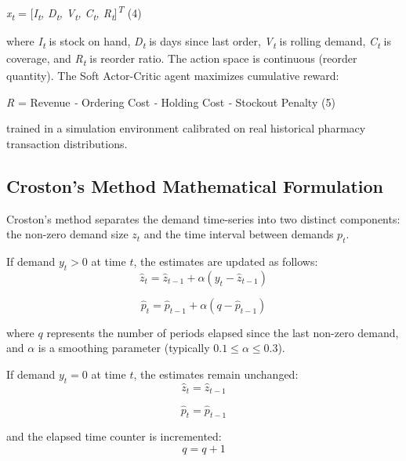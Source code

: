 \documentclass[12pt,a4paper,oneside]{report}
\begin{document}
\emph{x\textsubscript{t}} = {[}\emph{I\textsubscript{t},
D\textsubscript{t}, V\textsubscript{t}, C\textsubscript{t},
R\textsubscript{t}}{]}\emph{\textsuperscript{T}} (4)

where \emph{I\textsubscript{t}} is stock on hand,
\emph{D\textsubscript{t}} is days since last order,
\emph{V\textsubscript{t}} is rolling demand, \emph{C\textsubscript{t}}
is coverage, and \emph{R\textsubscript{t}} is reorder ratio. The action
space is continuous (reorder quantity). The Soft Actor-Critic agent
maximizes cumulative reward:

\emph{R} = Revenue \emph{-} Ordering Cost \emph{-} Holding Cost \emph{-}
Stockout Penalty (5)

trained in a simulation environment calibrated on real historical
pharmacy transaction distributions.

\subsection{Croston's Method Mathematical Formulation}
\label{crostons-method-mathematical-formulation}

Croston's method separates the demand time-series into two distinct components: the non-zero demand size $z_t$ and the time interval between demands $p_t$. 

If demand $y_t > 0$ at time $t$, the estimates are updated as follows:
\begin{equation}
\hat{z}_t = \hat{z}_{t-1} + \alpha(y_t - \hat{z}_{t-1})
\end{equation}

\begin{equation}
\hat{p}_t = \hat{p}_{t-1} + \alpha(q - \hat{p}_{t-1})
\end{equation}

where $q$ represents the number of periods elapsed since the last non-zero demand, and $\alpha$ is a smoothing parameter (typically $0.1 \le \alpha \le 0.3$).

If demand $y_t = 0$ at time $t$, the estimates remain unchanged:
\begin{equation}
\hat{z}_t = \hat{z}_{t-1}
\end{equation}

\begin{equation}
\hat{p}_t = \hat{p}_{t-1}
\end{equation}

and the elapsed time counter is incremented:
\begin{equation}
q = q + 1
\end{equation}
\end{document}
